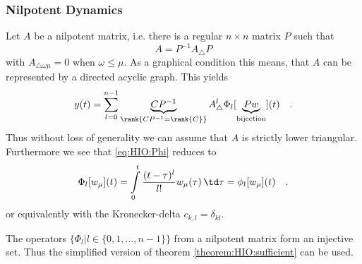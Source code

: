 \subsubsection{Nilpotent Dynamics}
	Let $A$ be a nilpotent matrix, i.e. there is a regular $n\times n$ matrix $P$ such 
	that
	\begin{equation}
 	A = P^{-1} A_\triangle P
	\end{equation}
	with $A_{\triangle \omega \mu} = 0$ when $\omega \leq \mu$. As a graphical condition 
	this means, that $A$ can be represented by a directed acyclic graph. This yields
	\begin{equation}
	y(t) = \sum\limits_{l=0}^{n-1} \underbrace{CP^{-1}}_{\rank{CP^{-1} 
	=\rank{C}} } A^l_\triangle \Phi_l[\underbrace{Pw}_\text{bijection} ](t) \quad .
	\end{equation}
	Thus without loss of generality we can assume that $A$ is strictly lower 
	triangular. Furthermore we see that \eqref{eq:HIO:Phi} reduces to
	\begin{equation}
	\Phi_l[w_\mu](t) = \int\limits_0^t \frac{(t-\tau)^l}{l!} w_\mu(\tau) \, \td\tau 
	= \phi_l[w_\mu](t)
	\quad .
	\label{eq:HIO:Phi_nil}
	\end{equation}
	or equivalently with the Kronecker-delta $c_{k,l}=\delta_{kl}$.



	\begin{corollary}
	The operators $\{\Phi_l|l\in\{0,1,\ldots,n-1\}\}$ from a nilpotent matrix form an 
	injective set. Thus the simplified version of theorem \ref{theorem:HIO:sufficient} 
	can be used.
	\end{corollary}
